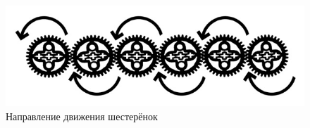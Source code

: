 \begin{figure}[h!]
	\begin{center}
		\includegraphics[width=0.88\linewidth]{chapters/chapter26/images/6}
		\caption{Направление движения шестерёнок}
		\label{ris:image26x6}
	\end{center}
\end{figure}